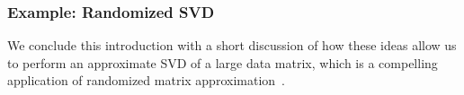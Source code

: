 \documentclass{article}
\begin{document}

\subsubsection{Example: Randomized SVD}
\label{sec:pca}

We conclude this introduction with a short discussion of how these ideas allow
us to perform an approximate SVD of a large data matrix,
which is a compelling application of randomized matrix approximation~\cite{tygert_szlam}.

\end{document}
